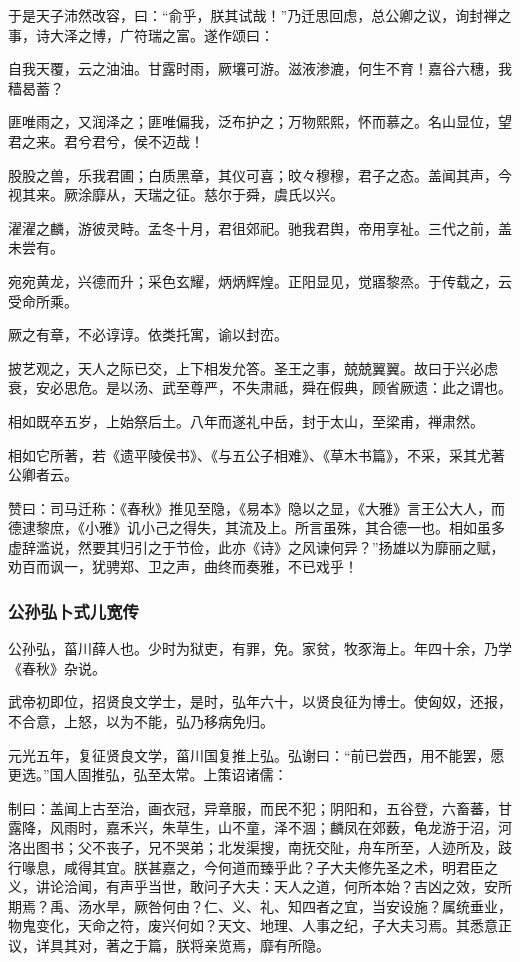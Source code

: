 \documentclass[]{article}
\begin{document}
于是天子沛然改容，曰：``俞乎，朕其试哉！''乃迁思回虑，总公卿之议，询封禅之事，诗大泽之博，广符瑞之富。遂作颂曰：

自我天覆，云之油油。甘露时雨，厥壤可游。滋液渗漉，何生不育！嘉谷六穗，我穑曷蓄？

匪唯雨之，又润泽之；匪唯偏我，泛布护之；万物熙熙，怀而慕之。名山显位，望君之来。君兮君兮，侯不迈哉！

股股之兽，乐我君圃；白质黑章，其仪可喜；旼々穆穆，君子之态。盖闻其声，今视其来。厥涂靡从，天瑞之征。慈尔于舜，虞氏以兴。

濯濯之麟，游彼灵畤。孟冬十月，君徂郊祀。驰我君舆，帝用享祉。三代之前，盖未尝有。

宛宛黄龙，兴德而升；采色玄耀，炳炳辉煌。正阳显见，觉寤黎烝。于传载之，云受命所乘。

厥之有章，不必谆谆。依类托寓，谕以封峦。

披艺观之，天人之际已交，上下相发允答。圣王之事，兢兢翼翼。故曰于兴必虑衰，安必思危。是以汤、武至尊严，不失肃祗，舜在假典，顾省厥遗：此之谓也。

相如既卒五岁，上始祭后土。八年而遂礼中岳，封于太山，至梁甫，禅肃然。

相如它所著，若《遗平陵侯书》、《与五公子相难》、《草木书篇》，不采，采其尤著公卿者云。

赞曰：司马迁称：《春秋》推见至隐，《易本》隐以之显，《大雅》言王公大人，而德逮黎庶，《小雅》讥小己之得失，其流及上。所言虽殊，其合德一也。相如虽多虚辞滥说，然要其归引之于节俭，此亦《诗》之风谏何异？''扬雄以为靡丽之赋，劝百而讽一，犹骋郑、卫之声，曲终而奏雅，不已戏乎！

\hypertarget{header-n4617}{%
\subsubsection{公孙弘卜式儿宽传}\label{header-n4617}}

公孙弘，菑川薛人也。少时为狱吏，有罪，免。家贫，牧豕海上。年四十余，乃学《春秋》杂说。

武帝初即位，招贤良文学士，是时，弘年六十，以贤良征为博士。使匈奴，还报，不合意，上怒，以为不能，弘乃移病免归。

元光五年，复征贤良文学，菑川国复推上弘。弘谢曰：``前已尝西，用不能罢，愿更选。''国人固推弘，弘至太常。上策诏诸儒：

制曰：盖闻上古至治，画衣冠，异章服，而民不犯；阴阳和，五谷登，六畜蕃，甘露降，风雨时，嘉禾兴，朱草生，山不童，泽不涸；麟凤在郊薮，龟龙游于沼，河洛出图书；父不丧子，兄不哭弟；北发渠搜，南抚交阯，舟车所至，人迹所及，跂行喙息，咸得其宜。朕甚嘉之，今何道而臻乎此？子大夫修先圣之术，明君臣之义，讲论洽闻，有声乎当世，敢问子大夫：天人之道，何所本始？吉凶之效，安所期焉？禹、汤水旱，厥咎何由？仁、义、礼、知四者之宜，当安设施？属统垂业，物鬼变化，天命之符，废兴何如？天文、地理、人事之纪，子大夫习焉。其悉意正议，详具其对，著之于篇，朕将亲览焉，靡有所隐。
\end{document}
